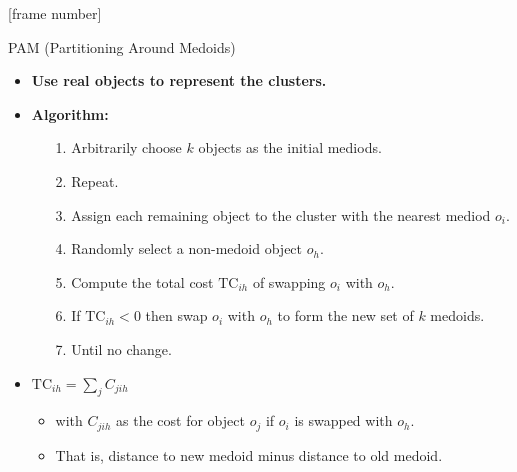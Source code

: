 \documentclass[aspectratio=169,t,xcolor=dvipsnames]{beamer}
\begin{document}
  {
    [frame number]
    \begin{frame}{PAM (Partitioning Around Medoids)}
      \begin{itemize}
        \item \textbf{Use real objects to represent the clusters.}
        \item \textbf{Algorithm:}
        \begin{itemize}
          \item[1.] Arbitrarily choose $k$ objects as the initial mediods.
          \item[2.] Repeat.
          \item[3.] \hspace{0.2cm} Assign each remaining object to the cluster with the nearest mediod $o_i$.
          \item[4.] \hspace{0.2cm} Randomly select a non-medoid object $o_h$.
          \item[5.] \hspace{0.2cm} Compute the total cost $\text{TC}_{ih}$ of swapping $o_i$ with $o_h$.
          \item[6.] \hspace{0.2cm} If $\text{TC}_{ih} < 0$ then swap $o_i$ with $o_h$ to form the new set of $k$ medoids.
          \item[7.] Until no change.
        \end{itemize}
        \item $\text{TC}_{ih} = \sum\limits_{j}C_{jih}$
        \begin{itemize}
          \item with $C_{jih}$ as the cost for object $o_j$ if $o_i$ is swapped with $o_h$.
          \item That is, distance to new medoid minus distance to old medoid.
        \end{itemize}
      \end{itemize}
    \end{frame}
  }
\end{document}
